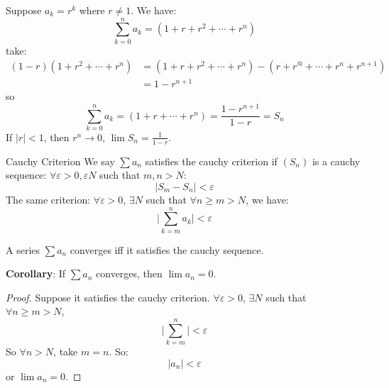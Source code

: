 \documentclass{report}
\begin{document}
\begin{examples}
    \begin{example}
        Suppose $a_{k} = r^{k}$ where $r \neq 1$. We have:
            \begin{equation*}
                \sum_{k = 0}^{n}a_{k} = (1 + r + r^{2} + \cdots +r^{n})
            \end{equation*}
        take:
            \begin{align*}
                (1 - r)(1 + r^{2} + \cdots +r^{n}) &= (1 + r + r^{2} + \cdots +r^{n}) - (r + r^{@} + \cdots +r^{n} + r^{n + 1}) \\
                                                   &= 1 - r^{n + 1}
            \end{align*}
        so 
            \begin{equation*}
                \sum_{k = 0}^{n}a_{k} = (1 + r + \cdots +r^{n}) = \dfrac{1 - r^{n + 1}}{1 - r} = S_{n}
            \end{equation*}
        If $\lvert r \rvert < 1$, then $r^{n} \rightarrow 0$, $\lim S_{n} = \frac{1}{1 - r}$.
    \end{example}
\end{examples}

\begin{definition}{Cauchy Criterion}
    We say $\sum a_{n}$ satisfies the cauchy criterion if $(S_{n})$ is a cauchy sequence: $\forall \varepsilon > 0, \varepsilon N$ such that $m, n > N$:
        \begin{equation*}
            \lvert S_{m} - S_{n} \rvert < \varepsilon
        \end{equation*}
The same criterion: $\forall \varepsilon> 0$, $\exists N$ such that $\forall n\geq m > N$, we have:
    \begin{equation*}
        \lvert \sum_{k = m}^{n}a_{k} \rvert < \varepsilon
    \end{equation*}
\end{definition}

\begin{theorem}{14.4}
    A series $\sum a_{n}$ converges iff it satisfies the cauchy sequence.
\end{theorem}

\textbf{Corollary}: If $\sum a_{n}$ converges, then $\lim a_{n} = 0$.
    \begin{proof}
        Suppose it satisfies the cauchy criterion. $\forall \varepsilon > 0$, $\exists N$ such that $\forall n \geq m > N$,
            \begin{equation*}
                \lvert \sum_{k = m}^{n} \rvert < \varepsilon
            \end{equation*}
        So $\forall n > N$, take $m = n$. So:
           \begin{equation*}
               \lvert a_{n} \rvert < \varepsilon
           \end{equation*}
        or $\lim a_{n} = 0.$
    \end{proof} 
\end{document}
